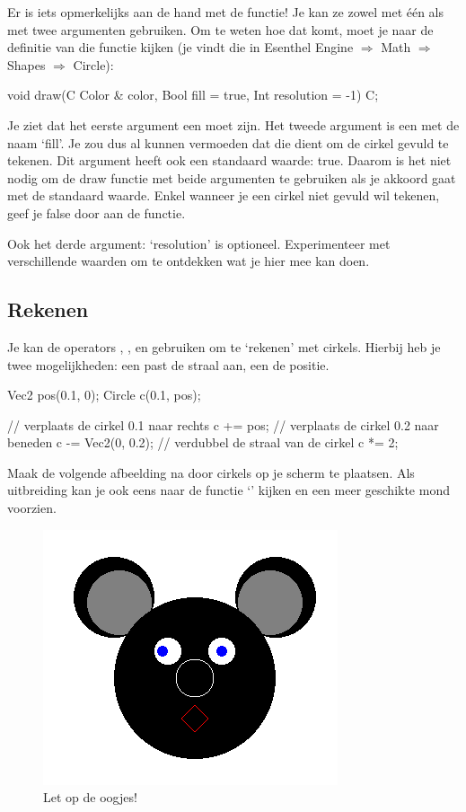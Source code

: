 Er is iets opmerkelijks aan de hand met de  functie! Je kan ze zowel met \'e\'en als met twee argumenten gebruiken. Om te weten hoe dat komt, moet je naar de definitie van die functie kijken (je vindt die in Esenthel Engine $\Rightarrow$ Math $\Rightarrow$ Shapes $\Rightarrow$ Circle):

\begin{code}
void draw(C Color & color, Bool fill = true, Int resolution = -1) C;
\end{code}

Je ziet dat het eerste argument een  moet zijn. Het tweede argument is een  met de naam `fill'. Je zou dus al kunnen vermoeden dat die dient om de cirkel gevuld te tekenen. Dit argument heeft ook een standaard waarde: true. Daarom is het niet nodig om de draw functie met beide argumenten te gebruiken als je akkoord gaat met de standaard waarde. Enkel wanneer je een cirkel niet gevuld wil tekenen, geef je false door aan de functie.


\begin{note}
Ook het derde argument: `resolution' is optioneel. Experimenteer met verschillende waarden om te ontdekken wat je hier mee kan doen.
\end{note}

\subsection{Rekenen}
Je kan de operators \eeOpp{+=}, \eeOpp{-=}, \eeOpp{/=} en \eeOpp{*=} gebruiken om te `rekenen' met cirkels. Hierbij heb je twee mogelijkheden: een  past de straal aan, een  de positie.

\begin{code}
Vec2 pos(0.1, 0);
Circle c(0.1, pos);

// verplaats de cirkel 0.1 naar rechts
c += pos;
// verplaats de cirkel 0.2 naar beneden
c -= Vec2(0, 0.2);
// verdubbel de straal van de cirkel
c *= 2;
\end{code}

\begin{exercise}
Maak de volgende afbeelding na door cirkels op je scherm te plaatsen. Als uitbreiding kan je ook eens naar de functie `' kijken en een meer geschikte mond voorzien.

\begin{figure}[h]
\centering
\includegraphics[width=0.4\linewidth]{../images/circle_exercise.png}
\caption[]{Let op de oogjes!}
\label{fig:pos2D}
\end{figure}

\end{exercise}

